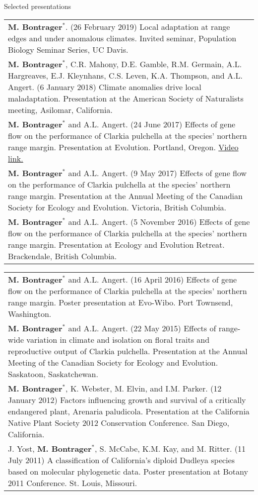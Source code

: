 \documentclass[letterpaper,11pt,oneside]{article}
\begin{document}

\noindent\Large{Selected presentations}  
\normalsize
\bigskip

\def\arraystretch{1.2}
\noindent \begin{tabular}{@{} >{\raggedright\arraybackslash}p{16.51cm}}
\textbf{M. Bontrager}$^{*}$. (26 February 2019) Local adaptation at range edges and under anomalous climates. Invited seminar, Population Biology Seminar Series, UC Davis. \\
\textbf{M. Bontrager}$^{*}$, C.R. Mahony, D.E. Gamble, R.M. Germain, A.L. Hargreaves, E.J. Kleynhans, C.S. Leven, K.A. Thompson, and A.L. Angert. (6 January 2018) Climate anomalies drive local maladaptation. Presentation at the American Society of Naturalists meeting, Asilomar, California. \\
\textbf{M. Bontrager}$^{*}$ and A.L. Angert. (24 June 2017) Effects of gene flow on the performance of Clarkia pulchella at the species’ northern range margin. Presentation at Evolution. Portland, Oregon. \href{https://www.youtube.com/watch?v=HqVgQzIJLyA}{Video link.} \\
\textbf{M. Bontrager}$^{*}$ and A.L. Angert. (9 May 2017) Effects of gene flow on the performance of Clarkia pulchella at the species’ northern range margin. Presentation at the Annual Meeting of the Canadian Society for Ecology and Evolution. Victoria, British Columbia. \\
\textbf{M. Bontrager}$^{*}$ and A.L. Angert. (5 November 2016) Effects of gene flow on the performance of Clarkia pulchella at the species’ northern range margin. Presentation at Ecology and Evolution Retreat. Brackendale, British Columbia. \\
\end{tabular}
\def\arraystretch{1.2}
\noindent \begin{tabular}{@{} >{\raggedright\arraybackslash}p{16.51cm}}
\textbf{M. Bontrager}$^{*}$ and A.L. Angert. (16 April 2016) Effects of gene flow on the performance of Clarkia pulchella at the species’ northern range margin. Poster presentation at Evo-Wibo. Port Townsend, Washington. \\
\textbf{M. Bontrager}$^{*}$ and A.L. Angert. (22 May 2015) Effects of range-wide variation in climate and isolation on floral traits and reproductive output of Clarkia pulchella. Presentation at the Annual Meeting of the Canadian Society for Ecology and Evolution. Saskatoon, Saskatchewan. \\
\textbf{M. Bontrager}$^{*}$, K. Webster, M. Elvin, and I.M. Parker. (12 January 2012) Factors influencing growth and survival of a critically endangered plant, Arenaria paludicola. Presentation at the California Native Plant Society 2012 Conservation Conference. San Diego, California. \\
J. Yost, \textbf{M. Bontrager}$^{*}$, S. McCabe, K.M. Kay, and M. Ritter. (11 July 2011) A classification of California’s diploid Dudleya species based on molecular phylogenetic data. Poster presentation at Botany 2011 Conference. St. Louis, Missouri. \\
\end{tabular}
\end{document}
